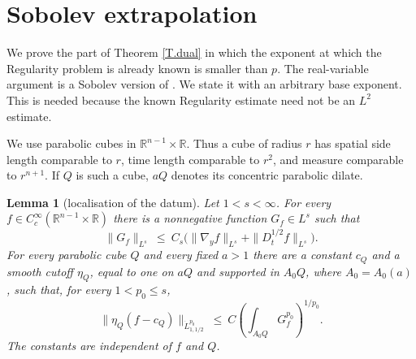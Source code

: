 \documentclass[12pt,leqno]{amsart}
\numberwithin{equation}{section}
\newcommand{\R}{\mathbb R}
\newcommand{\dhalf}{D_t^{1/2}}
\theoremstyle{plain}
\newtheorem{lemma}[equation]{Lemma}
\theoremstyle{remark}
\begin{document}
\section{Sobolev extrapolation}\label{S.extrapolation}

We prove the part of Theorem \ref{T.dual} in which the exponent at which the
Regularity problem is already known is smaller than $p$. The real-variable
argument is a Sobolev version of \cite[Theorem 3.1]{Shen}. We state it with an
arbitrary base exponent. This is needed because the known Regularity estimate
need not be an $L^2$ estimate.

We use parabolic cubes in $\R^{n-1}\times\R$. Thus a cube of radius $r$ has
spatial side length comparable to $r$, time length comparable to $r^2$, and
measure comparable to $r^{n+1}$. If $Q$ is such a cube, $aQ$ denotes its
concentric parabolic dilate.

\begin{lemma}[localisation of the datum]\label{L.datumloc}
Let $1<s<\infty$. For every $f\in C_c^\infty(\R^{n-1}\times\R)$ there is a
nonnegative function $G_f\in L^s$ such that
\begin{equation}\label{E.Gfnorm}
 \|G_f\|_{L^s}\ \le\ C_s\big(\|\nabla_yf\|_{L^s}
                  +\|\dhalf f\|_{L^s}\big).
\end{equation}
For every parabolic cube $Q$ and every fixed $a>1$ there are a constant $c_Q$
and a smooth cutoff $\eta_Q$, equal to one on $aQ$ and supported in $A_0Q$,
where $A_0=A_0(a)$, such that, for every $1<p_0\le s$,
\begin{equation}\label{E.datumloc}
 \big\|\eta_Q(f-c_Q)\big\|_{\dot L^{p_0}_{1,1/2}}
 \ \le\ C\left(\int_{A_0 Q}G_f^{p_0}\right)^{1/p_0}.
\end{equation}
The constants are independent of $f$ and $Q$.
\end{lemma}
\end{document}
